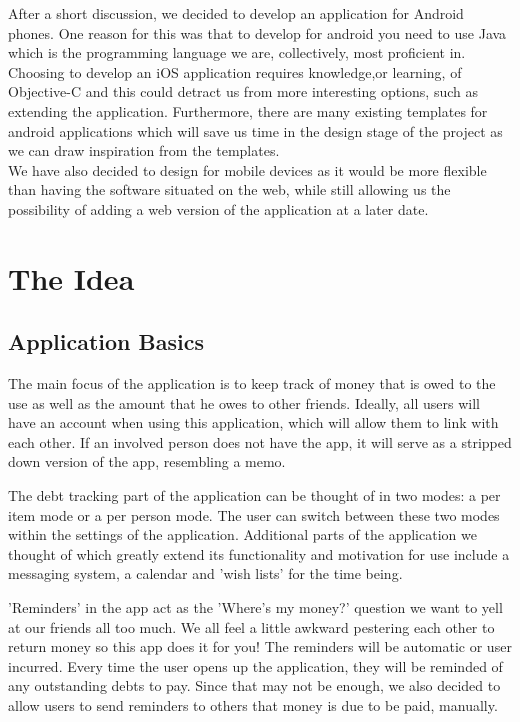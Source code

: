 \documentclass[a4paper,9t]{article}
\begin{document}
After a short discussion, we decided to develop an application for Android phones. One reason for this was that to develop for android you need to use Java which is the programming language we are, collectively, most proficient in. Choosing to develop an iOS application requires knowledge,or learning, of Objective-C and this could detract us from more interesting options, such as extending the application. Furthermore, there are many existing templates for android applications which will save us time in the design stage of the project as we can draw inspiration from the templates. \\
We have also decided to design for mobile devices as it would be more flexible than having the software situated on the web, while still allowing us the possibility of adding a web version of the application at a later date.

\section*{The Idea}

\subsection*{Application Basics}
The main focus of the application is to keep track of money that is owed to the use as well as the amount that he owes to other friends. Ideally, all users will have an account when using this application, which will allow them to link with each other. If an involved person does not have the app, it will serve as a stripped down version of the app, resembling a memo.

The debt tracking part of the application can be thought of in two modes: a per item mode or a per person mode. The user can switch between these two modes within the settings of the application.  
Additional parts of the application we thought of which greatly extend its functionality and motivation for use include a messaging system, a calendar and 'wish lists' for the time being. 

'Reminders' in the app act as the 'Where's my money?' question we want to yell at our friends all too much. We all feel a little awkward pestering each other to return money so this app does it for you!
The reminders will be automatic or user incurred. Every time the user opens up the application, they will be reminded of any outstanding debts to pay. Since that may not be enough, we also decided to allow users to send reminders to others that money is due to be paid, manually. 
\end{document}
